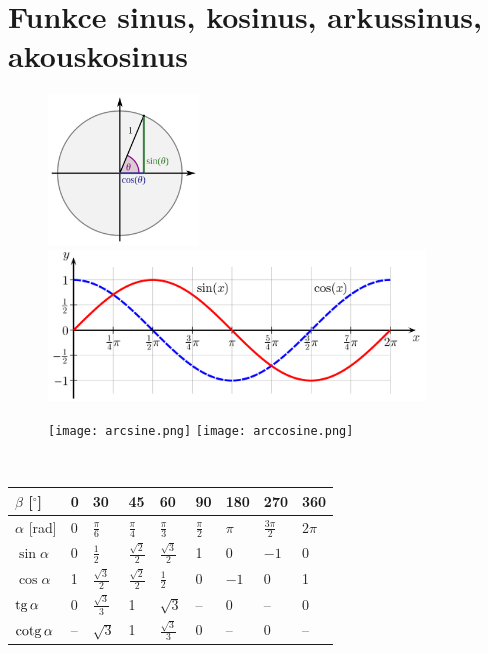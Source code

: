 \appendix
\section{Funkce sinus, kosinus, arkussinus, akouskosinus}\label{appa}
\begin{figure}[h]%
    \centering
    {{\includegraphics[height=4cm]{images/jednotkova_kruznice.png} }}%
    \qquad
    {{\includegraphics[height=4cm]{images/prubeh.png} }}%
\end{figure}

\begin{figure}[h]%
    \texttt{[image: arcsine.png]}
    \hfill
    \texttt{[image: arccosine.png]}
\end{figure}

\begin{pozn}\,\\
    \begin{tabularx}{\textwidth}{| p{} || p{} | p{} |
    p{} | p{} | p{} | p{} | p{}
    | p{} |}
    \hline
    $\beta$ [$^\circ$] & 0 & 30 & 45 & 60 & 90 & 180 & 270 & 360 \\
    \hline
    $\alpha$ [rad] & 0 & $\frac{\pi}{6}$ & $\frac{\pi}{4}$ & $\frac{\pi}{3}$ & $\frac{\pi}{2}$ & $\pi$ & $\frac{3\pi}{2}$ & $2\pi$\\
    \hline
    $\sin \alpha$ & 0 & $\frac{1}{2}$ & $\frac{\sqrt{2}}{2}$ & $\frac{\sqrt{3}}{2}$ & 1 & 0 & $-1$ & 0\\
    \hline
    $\cos \alpha$ & 1 & $\frac{\sqrt{3}}{2}$ & $\frac{\sqrt{2}}{2}$ & $\frac{1}{2}$ & 0 & $-1$ & 0 & 1\\
    \hline
    $\operatorname{tg} \alpha$ & 0 & $\frac{\sqrt{3}}{3}$ & 1 & $\sqrt{3}$ & -- & 0 & -- & 0\\
    \hline
    $\operatorname{cotg} \alpha$ & -- & $\sqrt{3}$ & 1 & $\frac{\sqrt{3}}{3}$ & 0 & -- & 0 & --\\
    \hline
    \end{tabularx}
\end{pozn}

